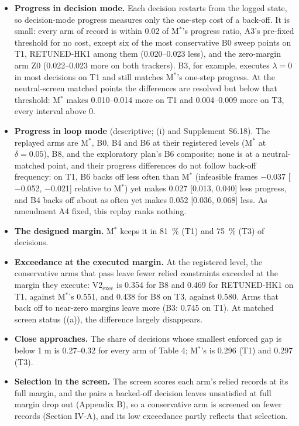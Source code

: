 \documentclass{ieeeaccess}
\begin{document}
\begin{itemize}
\item \textbf{Progress in decision mode.} Each decision restarts from the logged state, so decision-mode progress measures only the one-step cost of a back-off. It is small: every arm of record is within 0.02 of M$^{*}$'s progress ratio, A3's pre-fixed threshold for no cost, except six of the most conservative B0 sweep points on T1, RETUNED-HK1 among them (0.020--0.023 less), and the zero-margin arm Z0 (0.022--0.023 more on both trackers). B3, for example, executes $\lambda = 0$ in most decisions on T1 and still matches M$^{*}$'s one-step progress. At the neutral-screen matched points the differences are resolved but below that threshold: M$^{*}$ makes 0.010--0.014 more on T1 and 0.004--0.009 more on T3, every interval above 0.
\item \textbf{Progress in loop mode} (descriptive; (i) and Supplement S6.18). The replayed arms are M$^{*}$, B0, B4 and B6 at their registered levels (M$^{*}$ at $\delta = 0.05$), B8, and the exploratory plan's B6 composite; none is at a neutral-matched point, and their progress differences do not follow back-off frequency: on T1, B6 backs off less often than M$^{*}$ (infeasible frames $-$0.037 [$-$0.052, $-$0.021] relative to M$^{*}$) yet makes 0.027 [0.013, 0.040] less progress, and B4 backs off about as often yet makes 0.052 [0.036, 0.068] less. As amendment A4 fixed, this replay ranks nothing.
\item \textbf{The designed margin.} M$^{*}$ keeps it in 81~\% (T1) and 75~\% (T3) of decisions.
\item \textbf{Exceedance at the executed margin.} At the registered level, the conservative arms that pass leave fewer relied constraints exceeded at the margin they execute: V2$_{\mathrm{exec}}$ is 0.354 for B8 and 0.469 for RETUNED-HK1 on T1, against M$^{*}$'s 0.551, and 0.438 for B8 on T3, against 0.580. Arms that back off to near-zero margins leave more (B3: 0.745 on T1). At matched screen status ((a)), the difference largely disappears.
\item \textbf{Close approaches.} The share of decisions whose smallest enforced gap is below 1 m is 0.27--0.32 for every arm of Table 4; M$^{*}$'s is 0.296 (T1) and 0.297 (T3).
\item \textbf{Selection in the screen.} The screen scores each arm's relied records at its full margin, and the pairs a backed-off decision leaves unsatisfied at full margin drop out (Appendix B), so a conservative arm is screened on fewer records (Section IV-A), and its low exceedance partly reflects that selection.
\end{itemize}
\end{document}
